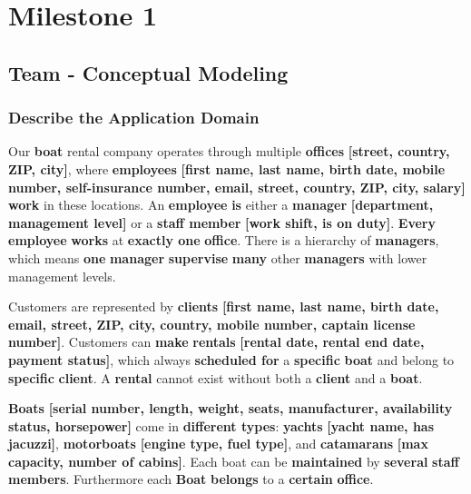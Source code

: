 \documentclass[a4paper, 11pt]{article}          %
\begin{document}

\newcommand{\entity}[1]{\textcolor{entityblue}{\textbf{#1}}}
\newcommand{\attribute}[1]{\textcolor{attributeyellow}{\textbf{#1}}}
\newcommand{\relationship}[1]{\textcolor{relationshippink}{\textbf{#1}}}
\newcommand{\cardinality}[1]{\textcolor{cardinalitygreen}{\textbf{#1}}}


\section{Milestone 1}

\subsection{Team - Conceptual Modeling}                           
\subsubsection{Describe the Application Domain}

Our \entity{boat} rental company operates through multiple \entity{offices} \attribute{[street, country, ZIP, city]}, where \entity{employees} \attribute{[first name, last name, birth date, mobile number, self-insurance number, email, street, country, ZIP, city, salary]} \relationship{work} in these locations. An \entity{employee} \relationship{is} either a \entity{manager} \attribute{[department, management level]} or a \entity{staff member} \attribute{[work shift, is on duty]}. \cardinality{Every} \entity{employee} \relationship{works} at \cardinality{exactly one} \entity{office}. There is a hierarchy of \entity{managers}, which means \cardinality{one} \entity{manager} \relationship{supervise} \cardinality{many} other \entity{managers} with lower management levels.
\par
Customers are represented by \entity{clients} \attribute{[first name, last name, birth date, email, street, ZIP, city, country, mobile number, captain license number]}. Customers can \relationship{make} \entity{rentals} \attribute{[rental date, rental end date, payment status]}, which always \relationship{scheduled for} a \cardinality{specific} \entity{boat} and belong to \cardinality{specific} \entity{client}. A \entity{rental} cannot exist without both a \entity{client} and a \entity{boat}.
\par
\entity{Boats} \attribute{[serial number, length, weight, seats, manufacturer, availability status, horsepower]} come in \relationship{different types}: \entity{yachts} \attribute{[yacht name, has jacuzzi]}, \entity{motorboats} \attribute{[engine type, fuel type]}, and \entity{catamarans} \attribute{[max capacity, number of cabins]}. Each boat can be \relationship{maintained} by \cardinality{several} \entity{staff members}. Furthermore each \entity{Boat} \relationship{belongs} to a \cardinality{certain} \entity{office}.
\end{document}
